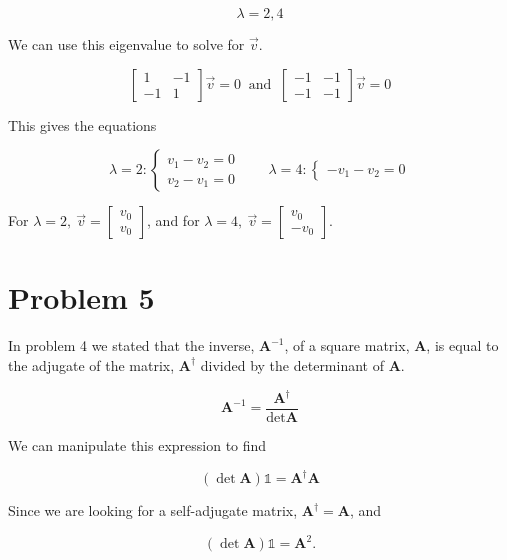 \documentclass{article}
\begin{document}
$$\boxed{ \lambda = 2, 4 }$$

We can use this eigenvalue to solve for $\vec{v}$. 

$$\begin{bmatrix}
1 	&	-1	\\
-1	&	1	\end{bmatrix}\vec{v} = 0 \ \text{ and } \ 
\begin{bmatrix}
-1 	&	-1	\\
-1	&	-1	\end{bmatrix}\vec{v} = 0 $$ 

This gives the equations

$$ \lambda = 2: \begin{cases} v_1 - v_2 = 0 \\
                              v_2 - v_1 = 0 \end{cases}
\qquad \lambda = 4: \begin{cases}  -v_1 - v_2 = 0 \end{cases} $$

For $\boxed{ \lambda = 2, \ \vec{v} = \begin{bmatrix}v_0 \\ v_0\end{bmatrix} }$, and for $\boxed{ \lambda = 4, \ \vec{v} = \begin{bmatrix}v_0 \\ -v_0\end{bmatrix} }$.




\section*{Problem 5}

In problem 4 we stated that the inverse, $\textbf{A}^{-1}$, of a square matrix, $\textbf{A}$,  is equal to the adjugate of the matrix, $\textbf{A}^{\dagger}$ divided by the determinant of $\textbf{A}$.

$$ \textbf{A}^{-1} = \frac{\textbf{A}^{\dagger}}{\det{\textbf{A}}} $$

We can manipulate this expression to find

$$ (\det{\textbf{A}})\mathbb{1} = \textbf{A}^{\dagger}\textbf{A} $$

Since we are looking for a self-adjugate matrix, $\textbf{A}^{\dagger} = \textbf{A}$, and 

$$ (\det{\textbf{A}})\mathbb{1} = \textbf{A}^2 .$$
\end{document}
